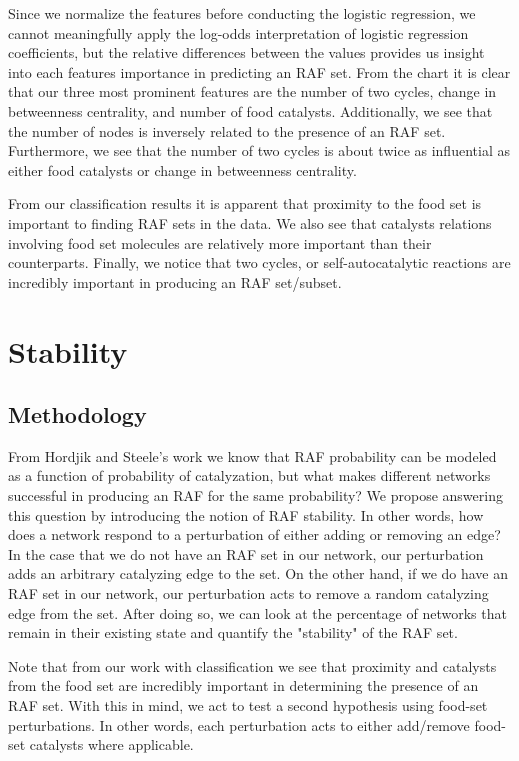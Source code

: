 \documentclass[11pt]{article}
\begin{document}
Since we normalize the features before conducting the logistic regression, we cannot meaningfully apply the log-odds interpretation of logistic regression coefficients, but the relative differences between the values provides us insight into each features importance in predicting an RAF set.
From the chart it is clear that our three most prominent features are the number of two cycles, change in betweenness centrality, and number of food catalysts. 
Additionally, we see that the number of nodes is inversely related to the presence of an RAF set.  
Furthermore, we see that the number of two cycles is about twice as influential as either food catalysts or change in betweenness centrality.  

From our classification results it is apparent that proximity to the food set is important to finding RAF sets in the data. 
We also see that catalysts relations involving food set molecules are relatively more important than their counterparts.
Finally, we notice that two cycles, or self-autocatalytic reactions are incredibly important in producing an RAF set/subset.

\section{Stability}

\subsection*{Methodology}

From Hordjik and Steele's work we know that RAF probability can be modeled as a function of probability of catalyzation, but what makes different networks successful in producing an RAF for the same probability? 
We propose answering this question by introducing the notion of RAF stability. In other words, how does a network respond to a perturbation of either adding or removing an edge?
In the case that we do not have an RAF set in our network, our perturbation adds an arbitrary catalyzing edge to the set. 
On the other hand, if we do have an RAF set in our network, our perturbation acts to remove a random catalyzing edge from the set. 
After doing so, we can look at the percentage of networks that remain in their existing state and quantify the "stability" of the RAF set. 

Note that from our work with classification we see that proximity and catalysts from the food set are incredibly important in determining the presence of an RAF set. 
With this in mind, we act to test a second hypothesis using food-set perturbations.
In other words, each perturbation acts to either add/remove food-set catalysts where applicable. 
\end{document}
